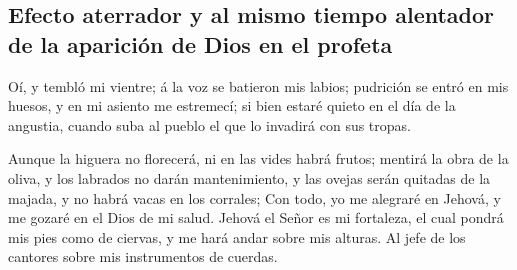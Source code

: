 \hypertarget{efecto-aterrador-y-al-mismo-tiempo-alentador-de-la-apariciuxf3n-de-dios-en-el-profeta}{%
\subsection{Efecto aterrador y al mismo tiempo alentador de la aparición
de Dios en el
profeta}\label{efecto-aterrador-y-al-mismo-tiempo-alentador-de-la-apariciuxf3n-de-dios-en-el-profeta}}

 Oí, y tembló mi vientre; á la voz se batieron mis labios;
pudrición se entró en mis huesos, y en mi asiento me estremecí; si bien
estaré quieto en el día de la angustia, cuando suba al pueblo el que lo
invadirá con sus tropas.

 Aunque la higuera no florecerá, ni en las vides habrá
frutos; mentirá la obra de la oliva, y los labrados no darán
mantenimiento, y las ovejas serán quitadas de la majada, y no habrá
vacas en los corrales;  Con todo, yo me alegraré en Jehová,
y me gozaré en el Dios de mi salud.  Jehová el Señor es mi
fortaleza, el cual pondrá mis pies como de ciervas, y me hará andar
sobre mis alturas. Al jefe de los cantores sobre mis instrumentos de
cuerdas.
